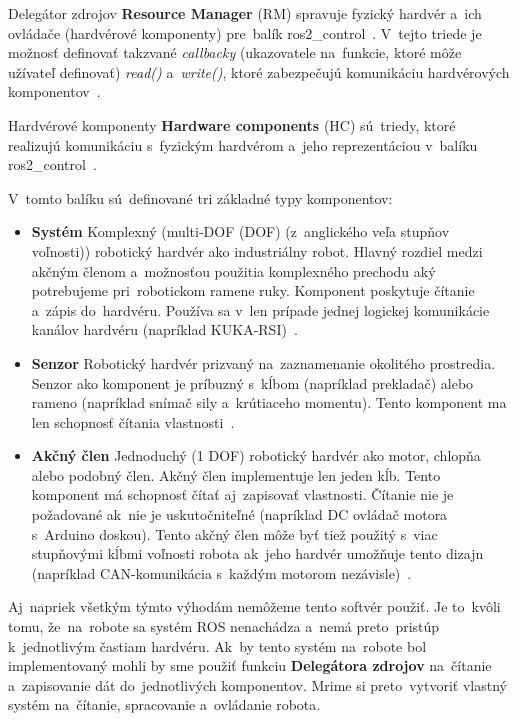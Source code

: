 Delegátor zdrojov \textbf{Resource Manager} (RM) spravuje fyzický hardvér a~ich ovládače (hardvérové komponenty)
pre~balík ros2\_control~\cite{roscontrol}. V~tejto triede je možnosť definovať takzvané \textit{callbacky}
(ukazovatele na~funkcie, ktoré môže užívateľ definovať) \textit{read()} a~\textit{write()}, ktoré zabezpečujú
komunikáciu hardvérových komponentov~\cite{roscontrol}.

Hardvérové komponenty \textbf{Hardware components} (HC) sú~triedy, ktoré realizujú komunikáciu s~fyzickým hardvérom
a~jeho reprezentáciou v~balíku ros2\_control~\cite{roscontrol}.

\clearpage

V~tomto balíku sú~definované tri základné typy komponentov:

\begin{itemize}
	\item \textbf{Systém} Komplexný (multi-DOF (\acrlong{DOF}) (z~anglického veľa stupňov voľnosti)) robotický hardvér ako industriálny
		robot. Hlavný rozdiel medzi akčným členom a~možnosťou použitia komplexného prechodu aký potrebujeme
		pri~robotickom ramene ruky. Komponent poskytuje čítanie a~zápis do~hardvéru. Používa sa v~len prípade jednej
		logickej komunikácie kanálov hardvéru (napríklad KUKA-RSI)~\cite{roscontrol}.
	\item \textbf{Senzor} Robotický hardvér prizvaný na~zaznamenanie okolitého prostredia. Senzor ako komponent je
		príbuzný s~kĺbom (napríklad prekladač) alebo rameno (napríklad snímač sily a~krútiaceho momentu). Tento
		komponent ma len schopnosť čítania vlastnosti~\cite{roscontrol}.
	\item \textbf{Akčný člen} Jednoduchý (1 DOF) robotický hardvér ako motor, chlopňa alebo podobný člen.
		Akčný člen implementuje len jeden kĺb. Tento komponent má schopnosť čítať aj~zapisovať vlastnosti. Čítanie nie
		je požadované ak~nie je uskutočniteľné (napríklad DC ovládač motora s~Arduino doskou). Tento akčný člen môže byť
		tiež použitý s~viac stupňovými kĺbmi voľnosti robota ak~jeho hardvér umožňuje tento dizajn (napríklad
		CAN-komunikácia s~každým motorom nezávisle)~\cite{roscontrol}.
\end{itemize}

Aj~napriek všetkým týmto výhodám nemôžeme tento softvér použiť. Je to~kvôli tomu, že~na~robote sa systém ROS nenachádza
a~nemá preto~pristúp k~jednotlivým častiam hardvéru. Ak~by tento systém na~robote bol implementovaný mohli by sme použiť
funkciu \textbf{Delegátora zdrojov} na~čítanie a~zapisovanie dát do~jednotlivých komponentov. Mrime si preto~vytvoriť
vlastný systém na~čítanie, spracovanie a~ovládanie robota.

